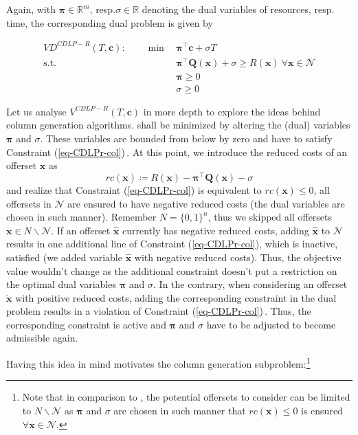 Again, with $\boldsymbol{\pi} \in \mathbb{R}^m$, resp.\xspace $\sigma \in \mathbb{R}$ denoting the dual variables of resources, resp.\xspace time, the corresponding dual problem is given by

\begin{align}
VD^{CDLP-R}(T, \boldsymbol{c}): \qquad \min\, &\boldsymbol{\pi}^\intercal \boldsymbol{c} + \sigma T\label{eq-CDLPr}\\
\text{s.t. } &\boldsymbol{\pi}^\intercal \boldsymbol{Q}(\boldsymbol{x}) + \sigma \geq R(\boldsymbol{x}) ~\forall \boldsymbol{x}\in \mathcal{N}\label{eq-CDLPr-col}\\
& \boldsymbol{\pi} \geq 0\\
& \sigma \geq 0
\end{align}

Let us analyse $V^{CDLP-R}(T, \boldsymbol{c})$ in more depth to explore the ideas behind column generation algorithms.  shall be minimized by altering the (dual) variables $\boldsymbol{\pi}$ and $\sigma$. These variables are bounded from below by zero and have to satisfy Constraint (\ref{eq-CDLPr-col})\,. At this point, we introduce the reduced costs of an offerset $\boldsymbol{x}$ as 
$$rc(\boldsymbol{x}) \coloneqq R(\boldsymbol{x}) - \boldsymbol{\pi}^\intercal \boldsymbol{Q}(\boldsymbol{x}) - \sigma$$
and realize that Constraint (\ref{eq-CDLPr-col}) is equivalent to $rc(\boldsymbol{x}) \leq 0$, \ie all offersets in $\mathcal{N}$ are ensured to have negative reduced costs (the dual variables are chosen in such manner). Remember $N = \{0, 1\}^n$, thus we skipped all offersets $\boldsymbol{x} \in N \backslash \mathcal{N}$. If an offerset $\hat{\boldsymbol{x}}$ currently has negative reduced costs, adding $\hat{\boldsymbol{x}}$ to $\mathcal{N}$ results in one additional line of Constraint (\ref{eq-CDLPr-col}), which is inactive, \ie satisfied (we added variable $\hat{\boldsymbol{x}}$ with negative reduced costs). Thus, the objective value wouldn't change as the additional constraint doesn't put a restriction on the optimal dual variables $\boldsymbol{\pi}$ and $\sigma$. In the contrary, when considering an offerset $\check{\boldsymbol{x}}$ with positive reduced costs, adding the corresponding constraint in the dual problem results in a violation of Constraint (\ref{eq-CDLPr-col})\,. Thus, the corresponding constraint is active and $\boldsymbol{\pi}$ and $\sigma$ have to be adjusted to become admissible again. 

Having this idea in mind motivates the column generation subproblem:\footnote{Note that in comparison to \cite{Bront.2009}, the potential offersets to consider can be limited to $N \backslash \mathcal{N}$ as $\boldsymbol{\pi}$ and $\sigma$ are chosen in such manner that $rc(\boldsymbol{x}) \leq 0$ is ensured $\forall \boldsymbol{x}\in \mathcal{N}$.}

